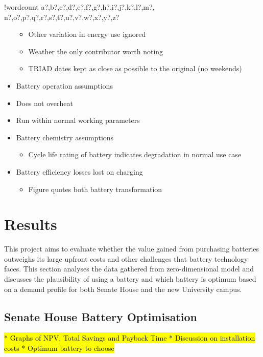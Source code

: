 \documentclass[fontsize=9.5pt]{extarticle}
\numberwithin{figure}{section} %
\providecommand{\tightlist}{%
  \setlength{\itemsep}{0pt}\setlength{\parskip}{0pt}}
\newcounter{words}
\newenvironment{counted}{%
  \setcounter{words}{0}
  \SearchList!{wordcount}{\stepcounter{words}}
    {a?,b?,c?,d?,e?,f?,g?,h?,i?,j?,k?,l?,m?,
    n?,o?,p?,q?,r?,s?,t?,u?,v?,w?,x?,y?,z?}
  \UndoBoundary{'}
  \SearchOrder{p;}}{%
  \StopSearching}
\begin{document}
\begin{counted}
\begin{itemize}
  \begin{itemize}
  \tightlist
  \item
    Other variation in energy use ignored
  \item
    Weather the only contributor worth noting
  \item
    TRIAD dates kept as close as possible to the original (no
    weekends)\\
  \end{itemize}
\item
  Battery operation assumptions
\item
  Does not overheat
\item
  Run within normal working parameters
\item
  Battery chemistry assumptions

  \begin{itemize}
  \tightlist
  \item
    Cycle life rating of battery indicates degradation in normal use
    case
  \end{itemize}
\item
  Battery efficiency losses lost on charging

  \begin{itemize}
  \tightlist
  \item
    Figure quotes both battery transformation
  \end{itemize}
\end{itemize}

\section{Results}\label{results}

This project aims to evaluate whether the value gained from purchasing
batteries outweighs its large upfront costs and other challenges that
battery technology faces. This section analyses the data gathered from
zero-dimensional model and discusses the plausibility of using a battery
and which battery is optimum based on a demand profile for both Senate
House and the new University campus.

\subsection{Senate House Battery
Optimisation}\label{senate-house-battery-optimisation}

\hl{
  * Graphs of NPV, Total Savings and Payback Time
  * Discussion on installation costs
  * Optimum battery to choose
}


\end{counted}
\end{document}
